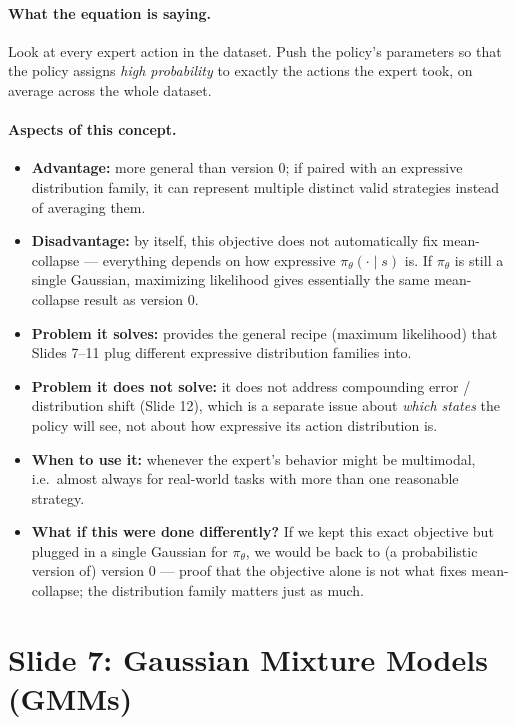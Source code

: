 \documentclass[11pt]{article}
\begin{document}
\paragraph{What the equation is saying.}
Look at every expert action in the dataset. Push the policy's parameters so that the
policy assigns \emph{high probability} to exactly the actions the expert took, on
average across the whole dataset.

\paragraph{Aspects of this concept.}
\begin{itemize}
\item \textbf{Advantage:} more general than version 0; if paired with an expressive
distribution family, it can represent multiple distinct valid strategies instead of
averaging them.
\item \textbf{Disadvantage:} by itself, this objective does not automatically fix
mean-collapse --- everything depends on how expressive $\pi_\theta(\cdot\mid s)$ is. If
$\pi_\theta$ is still a single Gaussian, maximizing likelihood gives essentially the same
mean-collapse result as version 0.
\item \textbf{Problem it solves:} provides the general recipe (maximum likelihood) that
Slides 7--11 plug different expressive distribution families into.
\item \textbf{Problem it does not solve:} it does not address compounding error /
distribution shift (Slide 12), which is a separate issue about \emph{which states} the
policy will see, not about how expressive its action distribution is.
\item \textbf{When to use it:} whenever the expert's behavior might be multimodal, i.e.\
almost always for real-world tasks with more than one reasonable strategy.
\item \textbf{What if this were done differently?} If we kept this exact objective but
plugged in a single Gaussian for $\pi_\theta$, we would be back to (a probabilistic
version of) version 0 --- proof that the objective alone is not what fixes mean-collapse;
the distribution family matters just as much.
\end{itemize}

\section{Slide 7: Gaussian Mixture Models (GMMs)}
\end{document}

